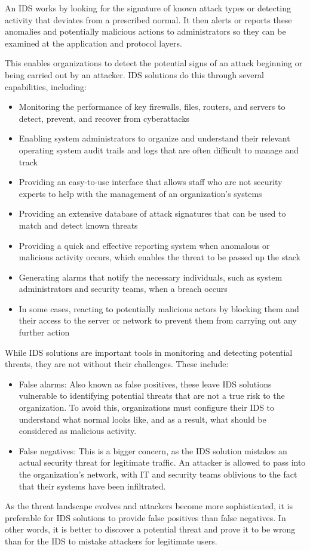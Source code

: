 An IDS works by looking for the signature of known attack types or detecting activity that deviates from a prescribed normal. It then alerts or reports these anomalies and potentially malicious actions to administrators so they can be examined at the application and protocol layers.

This enables organizations to detect the potential signs of an attack beginning or being carried out by an attacker. IDS solutions do this through several capabilities, including:
\begin{itemize}
    \item Monitoring the performance of key firewalls, files, routers, and servers to detect, prevent, and recover from cyberattacks
    \item Enabling system administrators to organize and understand their relevant operating system audit trails and logs that are often difficult to manage and track
    \item Providing an easy-to-use interface that allows staff who are not security experts to help with the management of an organization’s systems
    \item Providing an extensive database of attack signatures that can be used to match and detect known threats
    \item Providing a quick and effective reporting system when anomalous or malicious activity occurs, which enables the threat to be passed up the stack
    \item Generating alarms that notify the necessary individuals, such as system administrators and security teams, when a breach occurs
    \item In some cases, reacting to potentially malicious actors by blocking them and their access to the server or network to prevent them from carrying out any further action
\end{itemize}


While IDS solutions are important tools in monitoring and detecting potential threats, they are not without their challenges. These include:
\begin{itemize}
    \item False alarms: Also known as false positives, these leave IDS solutions vulnerable to identifying potential threats that are not a true risk to the organization. To avoid this, organizations must configure their IDS to understand what normal looks like, and as a result, what should be considered as malicious activity.
    \item False negatives: This is a bigger concern, as the IDS solution mistakes an actual security threat for legitimate traffic. An attacker is allowed to pass into the organization’s network, with IT and security teams oblivious to the fact that their systems have been infiltrated. 
\end{itemize}
As the threat landscape evolves and attackers become more sophisticated, it is preferable for IDS solutions to provide false positives than false negatives. In other words, it is better to discover a potential threat and prove it to be wrong than for the IDS to mistake attackers for legitimate users.


